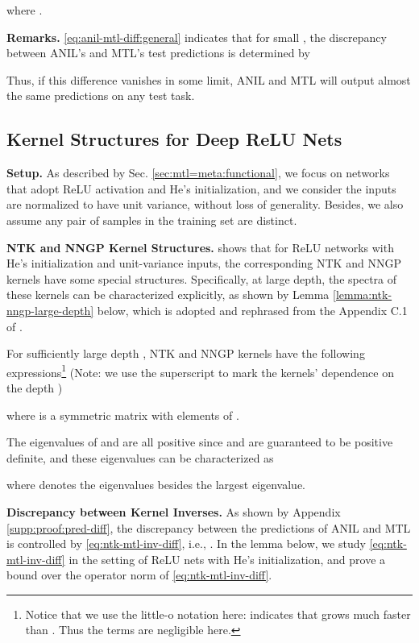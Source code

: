\documentclass{article}
\begin{document}
where .

\textbf{Remarks.} \eqref{eq:anil-mtl-diff:general} indicates that for small , the discrepancy between ANIL's and MTL's test predictions is determined by 

Thus, if this difference vanishes in some limit, ANIL and MTL will output almost the same predictions on any test task.

\subsection{Kernel Structures for Deep ReLU Nets}\label{supp:proof:relu-kernel-structures}

\textbf{Setup.} As described by Sec. \ref{sec:mtl=meta:functional}, we focus on networks that adopt ReLU activation and He's initialization, and we consider the inputs are normalized to have unit variance, without loss of generality. Besides, we also assume any pair of samples in the training set are distinct.


\textbf{NTK and NNGP Kernel Structures.} \citet{xiao2020dis} shows that for ReLU networks with He's initialization and unit-variance inputs, the corresponding NTK and NNGP kernels have some special structures. Specifically, at large depth, the spectra of these kernels can be characterized explicitly, as shown by Lemma \ref{lemma:ntk-nngp-large-depth} below, which is adopted and rephrased from the Appendix C.1 of \citet{xiao2020dis}.
\begin{lemma}\label{lemma:ntk-nngp-large-depth} For sufficiently large depth , NTK and NNGP kernels have the following expressions\footnote{Notice that we use the little-o notation here:  indicates that  grows much faster than . Thus the  terms are negligible here.} (Note: we use the superscript  to mark the kernels' dependence on the depth )
    
where  is a symmetric matrix with elements of .

The eigenvalues of  and  are all positive since  and  are guaranteed to be positive definite, and these eigenvalues can be characterized as

where  denotes the eigenvalues besides the largest eigenvalue.
\end{lemma}

\textbf{Discrepancy between Kernel Inverses.} As shown by Appendix \ref{supp:proof:pred-diff}, the discrepancy between the predictions of ANIL and MTL is controlled by \eqref{eq:ntk-mtl-inv-diff}, i.e., . In the lemma below, we study \eqref{eq:ntk-mtl-inv-diff} in the setting of ReLU nets with He's initialization, and prove a bound over the operator norm of \eqref{eq:ntk-mtl-inv-diff}.
\end{document}
